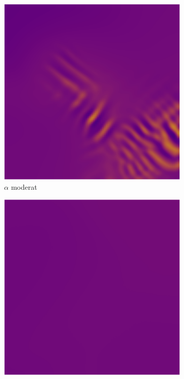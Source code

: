 \begin{frame}
\begin{figure}
\centering
\begin{subfigure}{0.32\textwidth}
\centering
\includegraphics[width=\textwidth]{images/ach_sim/nearly.pdf}
\caption{$\alpha$ moderat}
\end{subfigure}
%
\begin{subfigure}{0.32\textwidth}
\centering
\includegraphics[width=\textwidth]{images/ach_sim/strong.pdf}

\end{subfigure}
\end{figure}
\end{frame}
